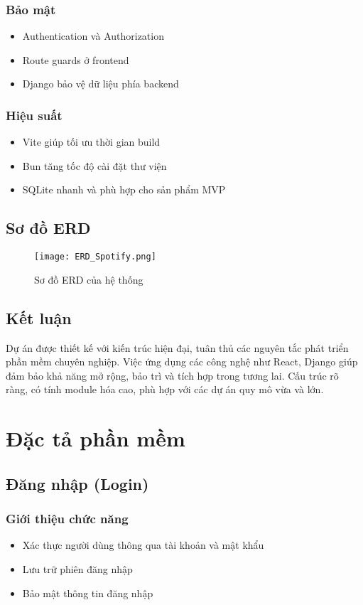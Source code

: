 \documentclass{book}
\let\oldsection\section
\renewcommand{\section}{\clearpage\oldsection}
\begin{document}
\subsection{Bảo mật}
\begin{itemize}
    \item Authentication và Authorization
    \item Route guards ở frontend
    \item Django bảo vệ dữ liệu phía backend
\end{itemize}

\subsection{Hiệu suất}
\begin{itemize}
    \item Vite giúp tối ưu thời gian build
    \item Bun tăng tốc độ cài đặt thư viện
    \item SQLite nhanh và phù hợp cho sản phẩm MVP
\end{itemize}

\section{Sơ đồ ERD}

\begin{figure}[h!]
    \centering
    \texttt{[image: ERD\_Spotify.png]}
    \caption{Sơ đồ ERD của hệ thống}
    \label{fig:erd}
\end{figure}
\section{Kết luận}
Dự án được thiết kế với kiến trúc hiện đại, tuân thủ các nguyên tắc phát triển phần mềm chuyên nghiệp. Việc ứng dụng các công nghệ như React, Django giúp đảm bảo khả năng mở rộng, bảo trì và tích hợp trong tương lai. Cấu trúc rõ ràng, có tính module hóa cao, phù hợp với các dự án quy mô vừa và lớn.
\chapter{Đặc tả phần mềm}

\section{Đăng nhập (Login)}
\subsection{Giới thiệu chức năng}
\begin{itemize}
    \item Xác thực người dùng thông qua tài khoản và mật khẩu
    \item Lưu trữ phiên đăng nhập
    \item Bảo mật thông tin đăng nhập
\end{itemize}
\end{document}
